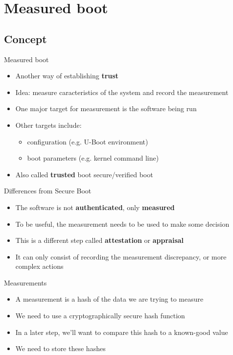 \section{Measured boot}

\subsection{Concept}

\begin{frame}{Measured boot}
  \begin{itemize}
    \item Another way of establishing \textbf{trust}
    \item Idea: measure caracteristics of the system and record the measurement
    \item One major target for measurement is the software being run
    \item Other targets include:
    \begin{itemize}
      \item configuration (e.g. U-Boot environment)
      \item boot parameters (e.g. kernel command line)
    \end{itemize}
    \item Also called \textbf{trusted} boot \code{!=} secure/verified boot
  \end{itemize}
\end{frame}

\begin{frame}{Differences from Secure Boot}
  \begin{itemize}
    \item The software is not \textbf{authenticated}, only \textbf{measured}
    \item To be useful, the measurement needs to be used to make some
          decision
    \item This is a different step called \textbf{attestation} or \textbf{appraisal}
    \item It can only consist of recording the measurement discrepancy, or more complex actions
  \end{itemize}
\end{frame}

\begin{frame}{Measurements}
  \begin{itemize}
    \item A measurement is a hash of the data we are trying to measure
    \item We need to use a cryptographically secure hash function
    \item In a later step, we'll want to compare this hash to a known-good value
    \item We need to store these hashes
  \end{itemize}
\end{frame}

